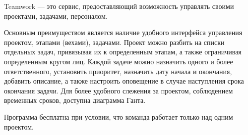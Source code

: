 Teamwork --- это сервис, предоставляющий возможность управлять своими проектами, задачами, персоналом.

Основным преимуществом является наличие удобного интерфейса управления проектом, этапами (вехами), задачами. 
Проект можно разбить на списки отдельных задач, привязывая их к определенным этапам, а также ограничивая определенным кругом лиц. 
Каждой задаче можно назначить одного и более ответственного, установить приоритет, назначить дату начала и окончания, добавить описание, а также настроить оповещение в случае наступления срока окончания задачи. Для более удобного слежения за проектом, соблюдением временных сроков, доступна диаграмма Ганта.

Программа бесплатна при условии, что команда работает только над одним проектом.
